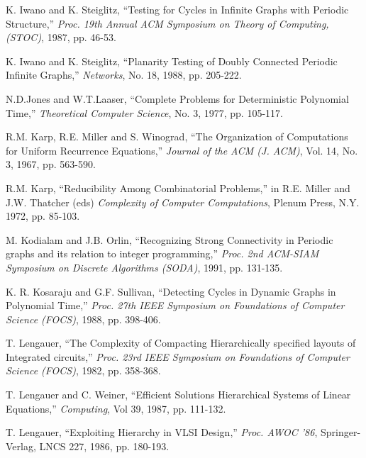 \begin{thebibliography}{HMRR93}
  K. Iwano and  K. Steiglitz,
``Testing for Cycles in  Infinite Graphs with Periodic Structure,''
{\em Proc.  19th Annual ACM Symposium on Theory of Computing, (STOC)}, 
1987, pp. 46-53.



  K. Iwano and  K. Steiglitz,
``Planarity Testing of Doubly Connected Periodic Infinite Graphs,''
{\em Networks},
No. 18, 1988, pp. 205-222.




N.D.Jones and W.T.Laaser, 
``Complete Problems for Deterministic Polynomial Time,'' 
{\em Theoretical Computer Science},
No.  3, 1977, pp. 105-117.


R.M. Karp, R.E. Miller and S. Winograd,
``The Organization of Computations for Uniform Recurrence Equations,''
{\em Journal of the ACM (J. ACM)}, Vol. 14, No. 3, 1967, pp. 563-590.




R.M. Karp,
``Reducibility Among Combinatorial Problems,''
in R.E. Miller and J.W. Thatcher (eds)
{\em Complexity of Computer  Computations}, Plenum Press,
N.Y. 1972, pp. 85-103.





M. Kodialam and  J.B. Orlin,
``Recognizing Strong Connectivity in Periodic graphs
and its relation to integer programming,''
{\em Proc. 2nd  ACM-SIAM Symposium on Discrete Algorithms (SODA)},
1991, pp. 131-135.





  K. R. Kosaraju and G.F. Sullivan,
``Detecting Cycles in  Dynamic Graphs in Polynomial Time,''
{\em Proc.  27th IEEE Symposium on Foundations of Computer Science (FOCS)}, 
1988, pp. 398-406.




T. Lengauer,
``The Complexity of  Compacting Hierarchically specified layouts of
Integrated circuits,''
{\em Proc. 23rd IEEE Symposium on Foundations of Computer Science (FOCS)}, 
1982, pp. 358-368.


T. Lengauer and  C. Weiner,
``Efficient Solutions Hierarchical Systems of Linear Equations,''  
{\em  Computing}, Vol 39, 1987, pp. 111-132.




T. Lengauer,
``Exploiting Hierarchy in VLSI Design,''
{\em Proc.  AWOC '86}, 
Springer-Verlag, LNCS 227, 1986, pp. 180-193.
	

\end{thebibliography}
